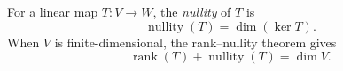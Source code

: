 
For a linear map $T:V\to W$, the \emph{nullity} of $T$ is
\[
\operatorname{nullity}(T)=\dim(\ker T).
\]
When $V$ is finite-dimensional, the rank--nullity theorem gives
\[
\operatorname{rank}(T)+\operatorname{nullity}(T)=\dim V.
\]
